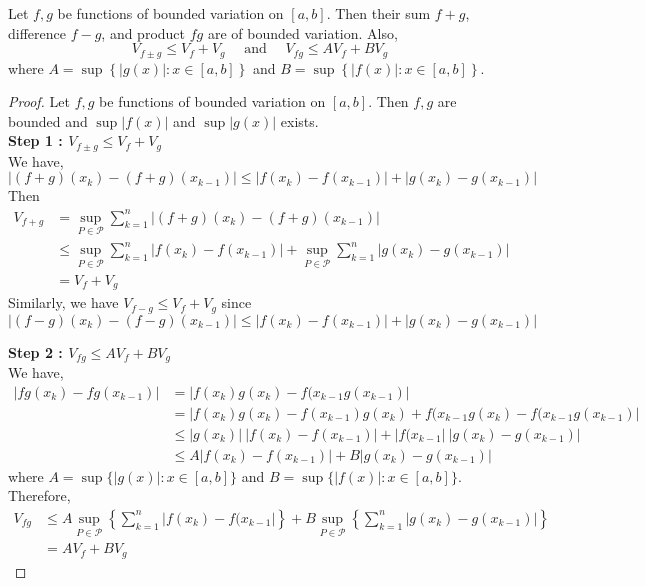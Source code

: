 \begin{theorem}
	Let $f,g$ be functions of bounded variation on $[a,b]$.
	Then their sum $f+g$, difference $f-g$, and product $fg$ are of bounded variation.
	Also, 
	\[ V_{f \pm g} \le V_f + V_g \quad \text{ and } \quad V_{fg} \le AV_f + BV_g \]
	where $\displaystyle A = \sup \left\{ |g(x)| : x \in [a,b] \right\}$ and $\displaystyle B = \sup \left\{ |f(x)| : x \in [a,b] \right\}$.
\end{theorem}
\begin{proof}
	Let $f,g$ be functions of bounded variation on $[a,b]$.
	Then $f,g$ are bounded and $\sup |f(x)|$ and $\sup |g(x)|$ exists.\\

	\textbf{Step 1 : $V_{f \pm g} \le V_f + V_g$}\\
	We have,
	\[ |(f+g)(x_k) - (f+g)(x_{k-1})| \le | f(x_k) - f(x_{k-1})| + |g(x_k) - g(x_{k-1})| \]
	Then
	\begin{align*}
	V_{f+g}  & = \sup_{P \in \mathscr{P}} \sum_{k=1}^n |(f+g)(x_k) - (f+g)(x_{k-1})| \\
	& \le \sup_{P \in \mathscr{P}} \sum_{k=1}^n |f(x_k) - f(x_{k-1})| + \sup_{P \in \mathscr{P}} \sum_{k=1}^n |g(x_k)-g(x_{k-1})| \\
	& = V_f + V_g 
\end{align*}
	Similarly, we have $V_{f-g} \le V_f + V_g$ since
	\[ |(f-g)(x_k) - (f-g)(x_{k-1})| \le |f(x_k)-f(x_{k-1})| + |g(x_k)-g(x_{k-1})| \]

	\textbf{Step 2 : $V_{fg} \le AV_f + BV_g$}\\
	We have,
	\begin{align*}
		|fg(x_k)-fg(x_{k-1})| & = |f(x_k)g(x_k) - f(x_{k-1}g(x_{k-1})| \\
		& = |f(x_k)g(x_k) - f(x_{k-1})g(x_k) + f(x_{k-1}g(x_k) - f(x_{k-1}g(x_{k-1}) | \\
		& \le |g(x_k)|\ |f(x_k)-f(x_{k-1})| + |f(x_{k-1}|\ |g(x_k) - g(x_{k-1})| \\
		& \le A |f(x_k)-f(x_{k-1})| + B |g(x_k)-g(x_{k-1})|
	\end{align*}
	where $A = \sup \{ |g(x)| : x \in [a,b] \}$ and $B = \sup \{ |f(x)| : x \in [a,b] \}$.\\

	Therefore,
	\begin{align*}
		V_{fg} & \le A \sup_{P \in \mathscr{P}} \left\{ \sum_{k=1}^n |f(x_k)-f(x_{k-1}| \right\} + B \sup_{P \in \mathscr{P}} \left\{ \sum_{k=1}^n |g(x_k)-g(x_{k-1})| \right\} \\
		& = AV_f + BV_g 
	\end{align*}
\end{proof}

